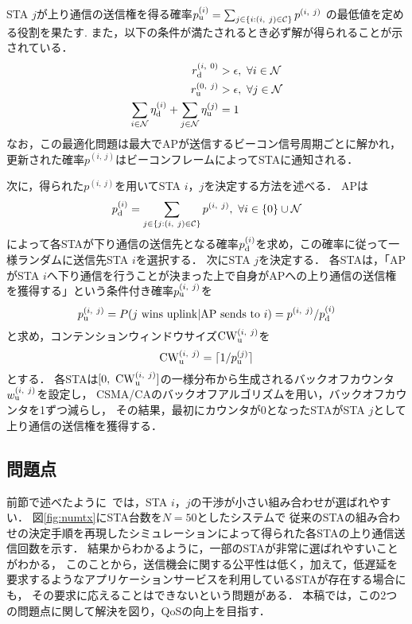 \documentclass[technicalreport]{ieicej}
\newcommand{\sij}{(i,\ j)}
\newcommand{\mN}{{\mathcal N}}
\newcommand{\pij}{p^{(i,\ j)}}
\begin{document}
		STA $j$が上り通信の送信権を得る確率$p_{\rm u}^{(i)}=\sum_{j\in\{i:(i,\ j)\in{\mathcal C}\}} p^{(i,\ j)}$
		の最低値を定める役割を果たす.
		また，以下の条件が満たされるとき必ず解が得られることが示されている．
		\begin{align}
			r_{\rm d}^{(i,\ 0)} &>\epsilon,\ \forall i\in\mN \\
			r_{\rm u}^{(0,\ j)} &>\epsilon,\ \forall j\in\mN \\
			\sum_{i\in\mN}\eta_{\rm d}^{(i)} + \sum_{j\in\mN}\eta_{\rm u}^{(j)} &=1 \label{eq:feasible}
		\end{align}
		なお，この最適化問題は最大でAPが送信するビーコン信号周期ごとに解かれ，更新された確率$\pij$はビーコンフレームによってSTAに通知される．
		\par
		次に，得られた$\pij$を用いてSTA $i$，$j$を決定する方法を述べる．
		APは
		\begin{equation}
			p_{\rm d}^{(i)}= \sum_{j\in\{j:(i,\ j)\in{\mathcal C}\}}p^{(i,\ j)},\ \forall i \in \{0\}\cup{\mathcal N}
		\end{equation}
		によって各STAが下り通信の送信先となる確率$p_{\rm d}^{(i)}$を求め，この確率に従って一様ランダムに送信先STA $i$を選択する．
		次にSTA $j$を決定する．
		各STAは，「APがSTA $i$へ下り通信を行うことが決まった上で自身がAPへの上り通信の送信権を獲得する」という条件付き確率$p_{\rm u}^{\sij}$を
		\begin{equation}
			p_{\rm u}^{\sij} = P(j\ {\rm wins\ uplink|AP\ sends\ to}\ i)=\pij / p_{\rm d}^{(i)}
		\end{equation}
		と求め，コンテンションウィンドウサイズ${\rm CW}^{\sij}_{\rm u}$を
		\begin{equation}
			{\rm CW}^{\sij}_{\rm u} = \lceil 1/p_{\rm u}^{(j)} \rceil
		\end{equation}
		とする．
		各STAは$[0,\ {\rm CW}^{\sij}_{\rm u}]$の一様分布から生成されるバックオフカウンタ$w_{\rm u}^{\sij}$を設定し，
		CSMA/CAのバックオフアルゴリズムを用い，バックオフカウンタを1ずつ減らし，
		その結果，最初にカウンタが0となったSTAがSTA $j$として上り通信の送信権を獲得する．

	\subsection{問題点}
		前節で述べたように~\cite{promac}では，STA $i$，$j$の干渉が小さい組み合わせが選ばれやすい．
		図\ref{fig:numtx}にSTA台数を$N=50$としたシステムで
		従来のSTAの組み合わせの決定手順を再現したシミュレーションによって得られた各STAの上り通信送信回数を示す．
		結果からわかるように，一部のSTAが非常に選ばれやすいことがわかる，
		このことから，送信機会に関する公平性は低く，加えて，低遅延を要求するようなアプリケーションサービスを利用しているSTAが存在する場合にも，
		その要求に応えることはできないという問題がある．
		本稿では，この2つの問題点に関して解決を図り，QoSの向上を目指す．
\end{document}
